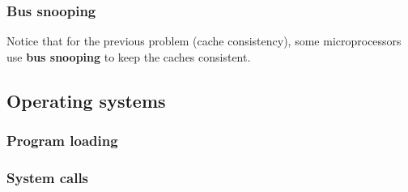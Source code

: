 
\begin{frame}
  \frametitle{Bus snooping}

  Notice that for the previous problem (cache consistency), some
  microprocessors use \textbf{bus snooping} to keep the caches
  consistent.

\end{frame}

%
%

\subsection{Operating systems}


\begin{frame}
  \frametitle{Program loading}

  \begin{center}
  \end{center}

\end{frame}


\begin{frame}
  \frametitle{System calls}

  \begin{center}
  \end{center}

\end{frame}
